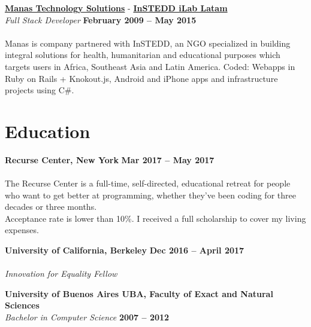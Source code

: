 \documentclass[margin,line]{resume}
\begin{document}
\begin{resume}
\textbf{\href{http://www.manas.com.ar/}{Manas Technology Solutions}} - 
\textbf{\href{http://www.instedd.org/}{InSTEDD iLab Latam}}\vspace{2mm}\\\vspace{1mm}
\textsl{Full Stack Developer} \hfill \textbf{February 2009 -- May 2015}\vspace{-3mm}\\\vspace{-1mm}
\\
Manas is company partnered with InSTEDD, an NGO specialized in building integral solutions for health, humanitarian and educational purposes which targets users in Africa, Southeast Asia and Latin America.  
Coded: Webapps in Ruby on Rails + Knokout.js, Android and iPhone  apps and infrastructure projects using C\#.



\section{\mysidestyle Education}


\textbf{Recurse Center, New York} \hfill \textbf{Mar 2017 -- May 2017}\vspace{-3mm}\\\vspace{-1mm}
\\
The Recurse Center is a full-time, self-directed, educational retreat for people who want to get better at programming, whether they've been coding for three decades or three months.  \\
Acceptance rate is lower than 10\%. I received a full scholarship to cover my living expenses.


\textbf{University of California, Berkeley} \hfill \textbf{Dec 2016 -- April 2017}\vspace{-3mm}\\\vspace{-1mm}
\\
\textsl{Innovation for Equality Fellow} 


\textbf{University of Buenos Aires UBA, Faculty of Exact and Natural Sciences} \vspace{2mm}\\\vspace{1mm}
\textsl{Bachelor in Computer Science} \hfill \textbf{2007 -- 2012}\vspace{-3mm}\\\vspace{-1mm}



\end{resume}
\end{document}
